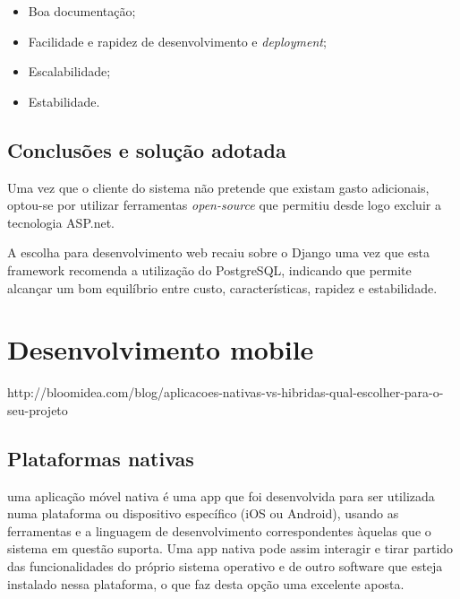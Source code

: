 \begin{itemize}
	\item Boa documentação;
	\item Facilidade e rapidez de desenvolvimento e \textit{deployment};
	\item Escalabilidade;
	\item Estabilidade.

\end{itemize}





\subsection{Conclusões e solução adotada}



Uma vez que o cliente do sistema não pretende que existam gasto adicionais, optou-se por utilizar ferramentas \textit{open-source} que permitiu desde logo excluir a tecnologia ASP.net. 


A escolha para desenvolvimento web recaiu sobre o Django uma vez que esta framework recomenda a utilização do PostgreSQL, indicando que permite alcançar um bom equilíbrio entre custo, características, rapidez e estabilidade\cite{Holovaty2009}. 













\newpage
\section{Desenvolvimento mobile}


http://bloomidea.com/blog/aplicacoes-nativas-vs-hibridas-qual-escolher-para-o-seu-projeto	

\subsection{Plataformas nativas}


uma aplicação móvel nativa é uma app que foi desenvolvida para ser utilizada numa plataforma ou dispositivo específico (iOS ou Android), usando as ferramentas e a linguagem de desenvolvimento correspondentes àquelas que o sistema em questão suporta. Uma app nativa pode assim interagir e tirar partido das funcionalidades do próprio sistema operativo e de outro software que esteja instalado nessa plataforma, o que faz desta opção uma excelente aposta.


